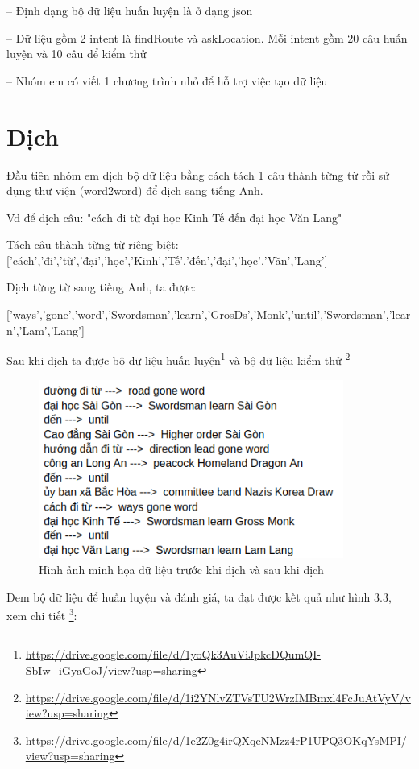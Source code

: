 -- Định dạng bộ dữ liệu huấn luyện là ở dạng json

-- Dữ liệu gồm 2 intent là findRoute và askLocation. Mỗi intent gồm 20 câu huấn luyện và 10 câu để kiểm thử

-- Nhóm em có viết 1 chương trình nhỏ để hỗ trợ việc tạo dữ liệu



\section{Dịch}

	Đầu tiên nhóm em dịch bộ dữ liệu bằng cách tách 1 câu thành từng từ rồi sử dụng thư viện (word2word) để dịch sang tiếng Anh.
	
	Vd để dịch câu: "cách đi từ đại học Kinh Tế đến đại học Văn Lang"
	
	Tách câu thành từng từ riêng biệt:
		['cách','đi','từ','đại','học','Kinh','Tế','đến','đại','học','Văn','Lang']
	
	Dịch từng từ sang tiếng Anh, ta được:
	
['ways','gone','word','Swordsman','learn','GrosDs','Monk','until','Swordsman','learn','Lam','Lang']
	
	Sau khi dịch ta được bộ dữ liệu huấn luyện\footnote{\url{https://drive.google.com/file/d/1yoQk3AuViJpkcDQumQI-SbIw_iGyaGoJ/view?usp=sharing}} và bộ dữ liệu kiểm thử \footnote{\url{https://drive.google.com/file/d/1i2YNlvZTVsTU2WrzIMBmxl4FcJuAtVyV/view?usp=sharing}}
	 \begin{figure}[htp]
              \centering
              \includegraphics[width=10cm]{images/trainingdata_dichtungtu.png} 
              \caption{Hình ảnh minh họa dữ liệu trước khi dịch và sau khi dịch}
              \label{fig:sodohethongchiduong}

          \end{figure} 


	Đem bộ dữ liệu để huấn luyện và đánh giá, ta đạt được kết quả như hình 3.3, xem chi tiết \footnote{\url{https://drive.google.com/file/d/1e2Z0g4irQXqeNMzz4rP1UPQ3OKqYsMPI/view?usp=sharing}}: 


